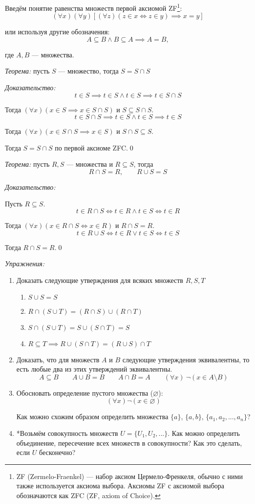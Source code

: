 Введём понятие равенства множеств первой аксиомой ZF\footnote{
	ZF (Zermelo-Fraenkel) --- набор аксиом Цермело-Френкеля, обычно с ними также
	используется аксиома выбора. Аксиомы ZF с аксиомой выбора
	обозначаются как ZFC (ZF, axiom of Choice).
}:
\[
	(\forall x)(\forall y)[(\forall z)(z\in x\iff z\in y)\implies x=y]
\]

или используя другие обозначения:
\[
	A\subseteq B\land B\subseteq A\implies A=B,
\]

где $A,B$ --- множества.

{\it Теорема:} пусть $S$ --- множество, тогда $S=S\cap S$

{\it Доказательство:}
\[
	t\in S\implies t\in S\land t\in S\implies t\in S\cap S
\]

Тогда $(\forall x)(x\in S\implies x\in S\cap S)$ и $S\subseteq S\cap S$.
\[
	t\in S\cap S\implies t\in S\land t\in S\implies t\in S
\]

Тогда $(\forall x)(x\in S\cap S\implies x\in S)$ и $S\cap S\subseteq S$.

Тогда $S=S\cap S$ по первой аксиоме ZFC.\qed

{\it Теорема:} пусть $R,S$ --- множества и $R\subseteq S$, тогда
\[
	R\cap S= R,\qquad R\cup S= S
\]

{\it Доказательство:}

Пусть $R\subseteq S$.
\[
	t\in R\cap S\iff t\in R\land t\in S\iff t\in R
\]

Тогда $(\forall x)(x\in R\cap S\iff x\in R)$ и $R\cap S=R$.
\[
	t\in R\cup S\iff t\in R\lor t\in S\iff t\in S
\]

Тогда $R\cap S=R$.\qed

{\it Упражнения:}
\begin{enumerate}
	\item{}Доказать следующие утверждения для всяких множеств $R,S,T$
	\begin{enumerate}
		\item{}$S\cup S=S$
		\item{}$R\cap (S\cup T)=(R\cap S)\cup (R\cap T)$
		\item{}$S\cap (S\cup T)=S\cup (S\cap T)=S$
		\item{}$R\subseteq T\implies R\cup (S\cap T)=(R\cup S)\cap T$
	\end{enumerate}

	\item{}Доказать, что для множеств $A$ и $B$ следующие утверждения эквивалентны,
	то есть любые два из этих утверждений эквивалентны.
	\[
		A\subseteq B\qquad A\cup B=B\qquad A\cap B=A
		\qquad (\forall x)~\lnot(x\in A\setminus B)
	\]
	\item{}Обосновать определение пустого множества ($\varnothing$):
	\[
		(\forall x)\lnot(x\in \varnothing)
	\]

	Как можно схожим образом определить множества $\{a\}$, $\{a,b\}$,
	$\{a_1,a_2,...,a_{n}\}$?
	\item{}*Возьмём совокупность множеств $U=\{U_{1},U_{2},...\}$.
	Как можно определить объединение, пересечение всех множеств в совокупности?
	Как это сделать, если $U$ бесконечно?
\end{enumerate}

